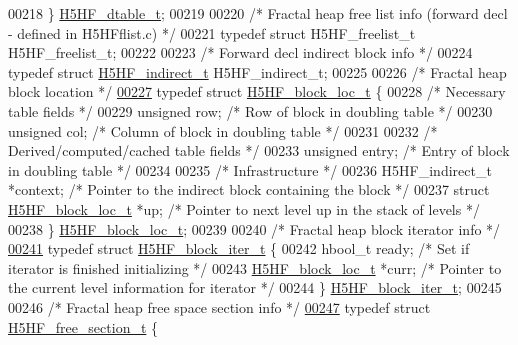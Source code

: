 \begin{DoxyCode}
00218 \} \hyperlink{struct_h5_h_f__dtable__t}{H5HF\_dtable\_t};
00219 
00220 \textcolor{comment}{/* Fractal heap free list info (forward decl - defined in H5HFflist.c) */}
00221 \textcolor{keyword}{typedef} \textcolor{keyword}{struct }H5HF\_freelist\_t H5HF\_freelist\_t;
00222 
00223 \textcolor{comment}{/* Forward decl indirect block info */}
00224 \textcolor{keyword}{typedef} \textcolor{keyword}{struct }\hyperlink{struct_h5_h_f__indirect__t}{H5HF\_indirect\_t} H5HF\_indirect\_t;
00225 
00226 \textcolor{comment}{/* Fractal heap block location */}
\hyperlink{struct_h5_h_f__block__loc__t}{00227} \textcolor{keyword}{typedef} \textcolor{keyword}{struct }\hyperlink{struct_h5_h_f__block__loc__t}{H5HF\_block\_loc\_t} \{
00228     \textcolor{comment}{/* Necessary table fields */}
00229     \textcolor{keywordtype}{unsigned}    row;            \textcolor{comment}{/* Row of block in doubling table             */}
00230     \textcolor{keywordtype}{unsigned}    col;            \textcolor{comment}{/* Column of block in doubling table          */}
00231 
00232     \textcolor{comment}{/* Derived/computed/cached table fields */}
00233     \textcolor{keywordtype}{unsigned}    entry;          \textcolor{comment}{/* Entry of block in doubling table           */}
00234 
00235     \textcolor{comment}{/* Infrastructure */}
00236     H5HF\_indirect\_t *context;   \textcolor{comment}{/* Pointer to the indirect block containing the block */}
00237     \textcolor{keyword}{struct }\hyperlink{struct_h5_h_f__block__loc__t}{H5HF\_block\_loc\_t} *up;  \textcolor{comment}{/* Pointer to next level up in the stack of levels */}
00238 \} \hyperlink{struct_h5_h_f__block__loc__t}{H5HF\_block\_loc\_t};
00239 
00240 \textcolor{comment}{/* Fractal heap block iterator info */}
\hyperlink{struct_h5_h_f__block__iter__t}{00241} \textcolor{keyword}{typedef} \textcolor{keyword}{struct }\hyperlink{struct_h5_h_f__block__iter__t}{H5HF\_block\_iter\_t} \{
00242     hbool\_t ready;              \textcolor{comment}{/* Set if iterator is finished initializing   */}
00243     \hyperlink{struct_h5_h_f__block__loc__t}{H5HF\_block\_loc\_t} *curr;     \textcolor{comment}{/* Pointer to the current level information for iterator */}
00244 \} \hyperlink{struct_h5_h_f__block__iter__t}{H5HF\_block\_iter\_t};
00245 
00246 \textcolor{comment}{/* Fractal heap free space section info */}
\hyperlink{struct_h5_h_f__free__section__t}{00247} \textcolor{keyword}{typedef} \textcolor{keyword}{struct }\hyperlink{struct_h5_h_f__free__section__t}{H5HF\_free\_section\_t} \{

\end{DoxyCode}
